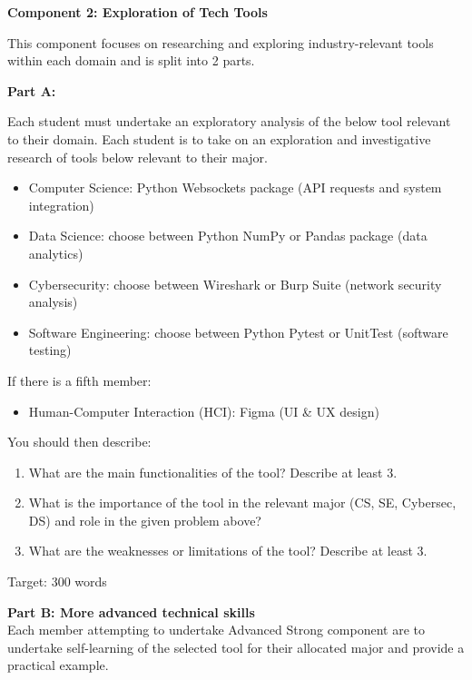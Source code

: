 \documentclass[a4paper, 11pt]{report}
\begin{document}
\textbf{Component 2: Exploration of Tech Tools}

This component focuses on researching and exploring industry-relevant tools within each domain and is split into 2 parts.

\vspace{2ex}


\textbf{Part A:}

Each student must undertake an exploratory analysis of the below tool relevant to their domain. 
Each student is to take on an exploration and investigative research of tools below relevant to their major. 

\begin{itemize}
    \item Computer Science: Python Websockets package (API requests and system integration)
    \item Data Science: choose between Python NumPy or Pandas package (data analytics)
    \item Cybersecurity: choose between Wireshark or Burp Suite (network security analysis)
    \item Software Engineering: choose between Python Pytest or UnitTest (software testing)
\end{itemize}
If there is a fifth member:
\begin{itemize}
    \item Human-Computer Interaction (HCI): Figma (UI \& UX design)
\end{itemize}

\vspace{4ex}

You should then describe:
\begin{enumerate}
    \item What are the main functionalities of the tool? Describe at least 3.
    \item What is the importance of the tool in the relevant major (CS, SE, Cybersec, DS) and role in the given problem above?
    \item What are the weaknesses or limitations of the tool? Describe at least 3.
\end{enumerate}
Target: 300 words

\vspace{4ex}

\textbf{Part B: More advanced technical skills}\\

Each member attempting to undertake Advanced Strong component are to undertake self-learning of the selected tool for their allocated major and provide a practical example.
\end{document}

